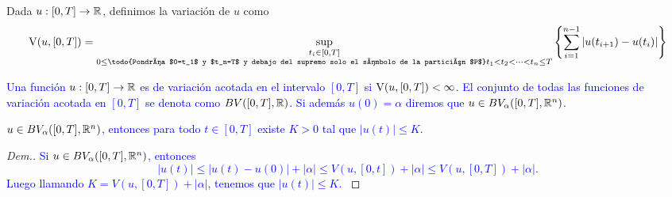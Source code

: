 \begin{defi}
	Dada $u:[0,T]\to \mathbb{R}$, definimos la variación  de $u$ como \label{def:variación}
	$$\V(u,[0,T])=\sup_{\substack{ t_i\in [0,T]\\
			0\leq\reversemarginpar \textrm{\todo{Pondría $0=t_1$ y $t_n=T$ y debajo del supremo solo el símbolo de la partición $P$}}t_1 < t_2< \dots < t_n  \leq T}}\left\lbrace \sum_{i=1}^{n-1}|u(t_{i+1})-u(t_i)|\right\rbrace $$
\end{defi}

\begin{defi}
\textcolor{blue}{ Una función $u:[0,T]\to \mathbb{R}$ es de variación acotada en el intervalo $[0,T]$ si $\operatorname{V}(u,[0,T])<\infty$.
	El conjunto de todas las funciones de variación acotada en $[0,T]$ se denota como $BV([0,T],\mathbb{R})$. Si además $u(0)=\alpha$ diremos que $u\in BV_\alpha([0,T],\mathbb{R}^n)$. }
\end{defi}
\begin{lem} \label{lem:var-acotada}
    \textcolor{blue}{ $u\in BV_\alpha([0,T],\mathbb{R}^n)$, entonces para todo $t\in[0,T]$ existe $K>0$ tal que $|u(t)|\leq K$.  }
\end{lem}
\begin{proof}[Dem.]\textcolor{blue}{
Si $u\in BV_\alpha([0,T],\mathbb{R}^n)$, entonces
    \begin{equation}
        |u(t)|\leq |u(t)-u(0)|+|\alpha|\leq V(u,[0,t])+|\alpha|\leq V(u,[0,T])+|\alpha|.
    \end{equation}
Luego llamando $K=V(u,[0,T])+|\alpha|$, tenemos que $|u(t)|\leq K$.  }
    
\end{proof}


